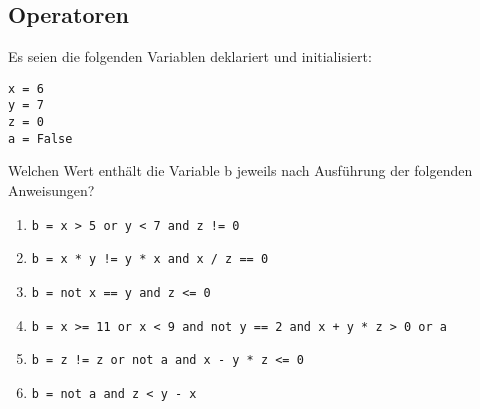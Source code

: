 \subsection{Operatoren}
Es seien die folgenden Variablen deklariert und initialisiert:
\begin{lstlisting}
x = 6
y = 7
z = 0
a = False
\end{lstlisting}
Welchen Wert enthält die Variable b jeweils nach Ausführung der folgenden Anweisungen?
\begin{enumerate}
\item \lstinline{b = x > 5 or y < 7 and z != 0}
\item \lstinline{b = x * y != y * x and x / z == 0}
\item \lstinline{b = not x == y and z <= 0}
\item \lstinline{b = x >= 11 or x < 9 and not y == 2 and x + y * z > 0 or a}
\item \lstinline{b = z != z or not a and x - y * z <= 0}
\item \lstinline{b = not a and z < y - x}
\end{enumerate}